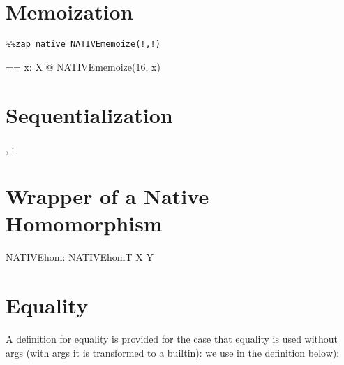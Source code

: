 \documentclass{article}
\begin{document}
\section{Memoization}

\begin{verbatim}
%%zap native NATIVEmemoize(!,!)
\end{verbatim}


\begin{axdef}[X]
  \MEMOIZE == \lambda x: \assumed \power X @ NATIVEmemoize(16, x)
\end{axdef}

\section{Sequentialization}

\begin{axdef}
  \BEGINSEQ, \ENDSEQ : \power []
\end{axdef}


\section{Wrapper of a Native Homomorphism}

\begin{zed}
  [NATIVEhomT] %
\end{zed}

\begin{axdef}[X,Y]
  NATIVEhom: \assumed NATIVEhomT \cross \power X \pfun Y
\end{axdef}


\section{Equality}

A definition for equality is provided for the case that equality is
used without args (with args it is transformed to a builtin): we use
in the definition below):
\end{document}
